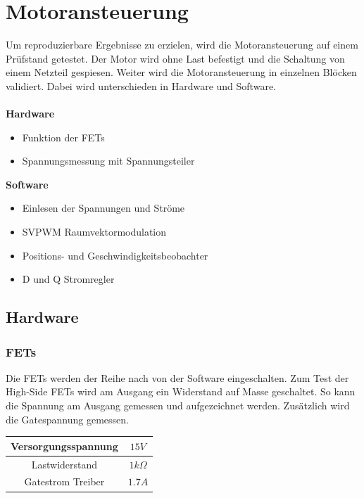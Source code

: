 \section{Motoransteuerung} \label{ValidMotoransteuerung}
Um reproduzierbare Ergebnisse zu erzielen, wird die Motoransteuerung auf einem Prüfstand getestet. Der Motor wird ohne Last befestigt und die Schaltung von einem Netzteil gespiesen. Weiter wird die Motoransteuerung in einzelnen Blöcken validiert. Dabei wird unterschieden in Hardware und Software.\\
\\
\textbf{Hardware}
\begin{itemize}
	\item Funktion der FETs
	\item Spannungsmessung mit Spannungsteiler
\end{itemize}
\textbf{Software}
\begin{itemize}
	\item Einlesen der Spannungen und Ströme
	\item SVPWM Raumvektormodulation
	\item Positions- und Geschwindigkeitsbeobachter
	\item D und Q Stromregler
\end{itemize}

\subsection*{Hardware}
\subsubsection*{FETs}
Die FETs werden der Reihe nach von der Software eingeschalten. Zum Test der High-Side FETs wird am Ausgang ein Widerstand auf Masse geschaltet. So kann die Spannung am Ausgang gemessen und aufgezeichnet werden. Zusätzlich wird die Gatespannung gemessen.

\begin{center}
	\begin{tabular}{|c|c|}
		\hline 
		Versorgungsspannung & $15V$ \\ \hline
		Lastwiderstand & $1k\Omega$ \\ \hline
		Gatestrom Treiber & $1.7A$ \\ \hline
	\end{tabular} 
	\label{tab:fetmessbed}
\end{center}

